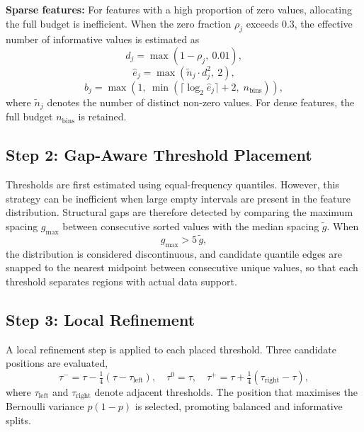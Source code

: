 \documentclass[journal,twoside,web]{ieeecolor}
\begin{document}
\textbf{Sparse features:} For features with a high proportion of
zero values, allocating the full budget is inefficient. When the
zero fraction $\rho_j$ exceeds 0.3, the effective number of
informative values is estimated as
\begin{equation}
  d_j = \max(1 - \rho_j,\ 0.01),
\end{equation}
\begin{equation}
  \hat{e}_j = \max\!\left(\tilde{n}_j \cdot d_j^{2},\ 2\right),
\end{equation}
\begin{equation}
  b_j = \max\!\left(1,\ \min\!\left(
        \lceil \log_2 \hat{e}_j \rceil + 2,\;
        n_\text{bins}\right)\right),
\end{equation}
where $\tilde{n}_j$ denotes the number of distinct non-zero values.
For dense features, the full budget $n_\text{bins}$ is retained.

\subsection{Step 2: Gap-Aware Threshold Placement}
\label{subsec:gaps}

Thresholds are first estimated using equal-frequency quantiles.
However, this strategy can be inefficient when large empty intervals
are present in the feature distribution. Structural gaps are therefore
detected by comparing the maximum spacing
$g_\text{max}$ between consecutive sorted values with the median
spacing $\tilde{g}$. When
\begin{equation}
  g_\text{max} > 5\,\tilde{g},
\end{equation}
the distribution is considered discontinuous, and candidate quantile
edges are snapped to the nearest midpoint between consecutive unique
values, so that each threshold separates regions with actual data
support.

\subsection{Step 3: Local Refinement}
\label{subsec:refine}

A local refinement step is applied to each placed threshold.
Three candidate positions are evaluated,
\begin{equation}
  \tau^{-} = \tau - \tfrac{1}{4}(\tau - \tau_\text{left}), \quad
  \tau^{0} = \tau, \quad
  \tau^{+} = \tau + \tfrac{1}{4}(\tau_\text{right} - \tau),
\end{equation}
where $\tau_\text{left}$ and $\tau_\text{right}$ denote adjacent
thresholds. The position that maximises the Bernoulli variance
$p(1-p)$ is selected, promoting balanced and informative splits.
\end{document}
